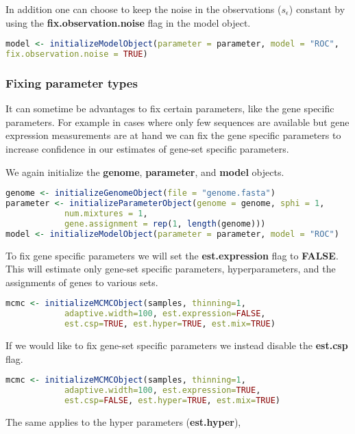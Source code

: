 In addition one can choose to keep the noise in the observations ($s_\epsilon$) constant by using the \textbf{fix.observation.noise} flag in the model object.

\begin{lstlisting}[language=R]
model <- initializeModelObject(parameter = parameter, model = "ROC",
fix.observation.noise = TRUE)
\end{lstlisting}

\subsubsection{Fixing parameter types}
It can sometime be advantages to fix certain parameters, like the gene specific parameters. 
For example in cases where only few sequences are available but gene expression measurements are at hand we can fix the gene specific parameters to increase confidence in our estimates of gene-set specific parameters.

We again initialize the \textbf{genome}, \textbf{parameter}, and \textbf{model} objects.

\begin{lstlisting}[language=R]
genome <- initializeGenomeObject(file = "genome.fasta")
parameter <- initializeParameterObject(genome = genome, sphi = 1, 
			num.mixtures = 1,
			gene.assignment = rep(1, length(genome)))
model <- initializeModelObject(parameter = parameter, model = "ROC")
\end{lstlisting}

To fix gene specific parameters we will set the \textbf{est.expression} flag to \textbf{FALSE}. This will estimate only gene-set
specific parameters, hyperparameters, and the assignments of genes to various sets.

\begin{lstlisting}[language=R]
mcmc <- initializeMCMCObject(samples, thinning=1, 
			adaptive.width=100, est.expression=FALSE, 
			est.csp=TRUE, est.hyper=TRUE, est.mix=TRUE)
\end{lstlisting}

If we would like to fix gene-set specific parameters we instead disable the \textbf{est.csp} flag.

\begin{lstlisting}[language=R]
mcmc <- initializeMCMCObject(samples, thinning=1, 
			adaptive.width=100, est.expression=TRUE, 
			est.csp=FALSE, est.hyper=TRUE, est.mix=TRUE)
\end{lstlisting}

The same applies to the hyper parameters (\textbf{est.hyper}),

